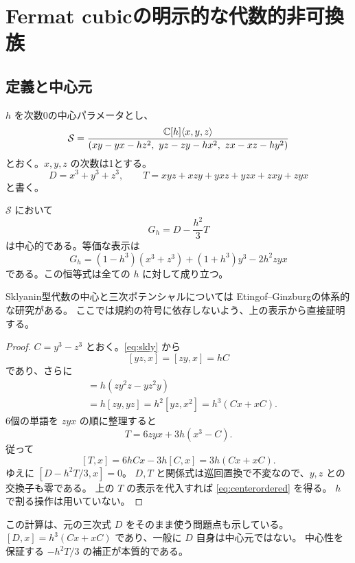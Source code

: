 \section{Fermat cubicの明示的な代数的非可換族}

\subsection{定義と中心元}

$h$ を次数0の中心パラメータとし、
\begin{equation}\label{eq:skly}
 \mathcal S=
 \frac{\mathbb C[h]\langle x,y,z\rangle}
 {(xy-yx-hz^2,\ yz-zy-hx^2,\ zx-xz-hy^2)}
\end{equation}
とおく。$x,y,z$ の次数は1とする。
\[
 D=x^3+y^3+z^3,\qquad
 T=xyz+xzy+yxz+yzx+zxy+zyx
\]
と書く。

\begin{theorem}[次数3の中心元の明示式]\label{thm:center}
$\mathscr S$ において
\begin{equation}\label{eq:center}
 G_h=D-\frac{h^2}{3}T
\end{equation}
は中心的である。等価な表示は
\begin{equation}\label{eq:centerordered}
 G_h=(1-h^3)(x^3+z^3)+(1+h^3)y^3-2h^2zyx
\end{equation}
である。この恒等式は全ての $h$ に対して成り立つ。
\end{theorem}

Sklyanin型代数の中心と三次ポテンシャルについては
Etingof--Ginzburg\cite{EG}の体系的な研究がある。
ここでは規約の符号に依存しないよう、上の表示から直接証明する。

\begin{proof}
$C=y^3-z^3$ とおく。\eqref{eq:skly} から
\[
 [yz,x]=[zy,x]=hC
\]
であり、さらに
\begin{align*}
 [D,x]
 &=h(zy^2z-yz^2y)\\
 &=h[zy,yz]
 =h^2[yz,x^2]
 =h^3(Cx+xC).
\end{align*}
6個の単語を $zyx$ の順に整理すると
\[
 T=6zyx+3h(x^3-C).
\]
従って
\[
 [T,x]=6hCx-3h[C,x]=3h(Cx+xC).
\]
ゆえに $[D-h^2T/3,x]=0$。
$D,T$ と関係式は巡回置換で不変なので、$y,z$ との交換子も零である。
上の $T$ の表示を代入すれば \eqref{eq:centerordered} を得る。
$h$ で割る操作は用いていない。
\end{proof}

この計算は、元の三次式 $D$ をそのまま使う問題点も示している。
$[D,x]=h^3(Cx+xC)$ であり、一般に $D$ 自身は中心元ではない。
中心性を保証する $-h^2T/3$ の補正が本質的である。

